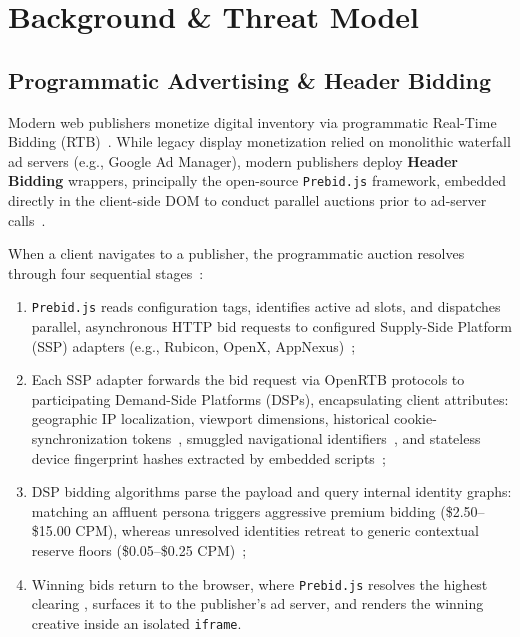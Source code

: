 \section{Background \& Threat Model}
\label{sec:background}

\subsection{Programmatic Advertising \& Header Bidding}
Modern web publishers monetize digital inventory via programmatic Real-Time Bidding (RTB)~\cite{castelluccia2014selling, bashir2016tracing}. 
While legacy display monetization relied on monolithic waterfall ad servers (e.g., Google Ad Manager), modern publishers deploy \textbf{Header Bidding} wrappers, principally the open-source \texttt{Prebid.js} framework, embedded directly in the client-side DOM to conduct parallel auctions prior to ad-server calls~\cite{pachilakis2019no, cook2020inferring}.

When a client navigates to a publisher, the programmatic auction resolves through four sequential stages~\cite{pachilakis2019no, barysei2023investigating}:
\begin{enumerate}
    \item \texttt{Prebid.js} reads configuration tags, identifies active ad slots, and dispatches parallel, asynchronous HTTP bid requests to configured Supply-Side Platform (SSP) adapters (e.g., Rubicon, OpenX, AppNexus)~\cite{cook2020inferring};
    \item Each SSP adapter forwards the bid request via OpenRTB protocols to participating Demand-Side Platforms (DSPs), encapsulating client attributes: geographic IP localization, viewport dimensions, historical cookie-synchronization tokens~\cite{papadopoulos2019cookie}, smuggled navigational identifiers~\cite{randall2022measuring}, and stateless device fingerprint hashes extracted by embedded scripts~\cite{papadogiannakis2021user};
    \item DSP bidding algorithms parse the payload and query internal identity graphs: matching an affluent persona triggers aggressive premium bidding (\$2.50--\$15.00 CPM), whereas unresolved identities retreat to generic contextual reserve floors (\$0.05--\$0.25 CPM)~\cite{barysei2023investigating};
    \item Winning bids return to the browser, where \texttt{Prebid.js} resolves the highest clearing \cpm, surfaces it to the publisher's ad server, and renders the winning creative inside an isolated \texttt{iframe}.
\end{enumerate}

